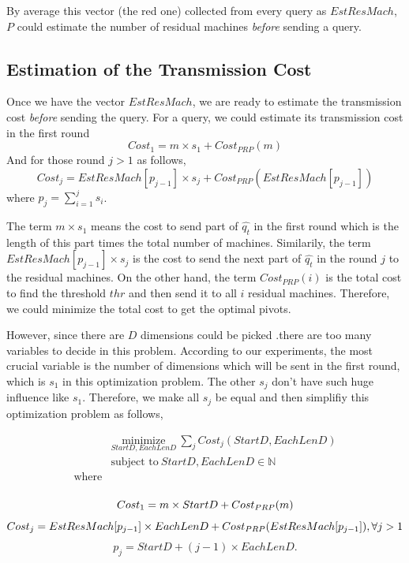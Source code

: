 By average this vector (the red one) collected from every query as $EstResMach$, $P$ could estimate the number of residual machines \emph{before} sending a query.



\subsection{Estimation of the Transmission Cost} %
\label{ss:estimate_the_transmission_cost}

Once we have the vector $EstResMach$, we are ready to estimate the transmission cost \emph{before} sending the query.  For a query, we could estimate its transmission cost in the first round 
\[
Cost_1 = m\times s_1 + Cost_{PRP}(m)
\]
And for those round $j>1$ as follows,
\[
Cost_j = EstResMach[p_{j-1}]\times s_j + Cost_{PRP}(EstResMach[p_{j-1}])
\]
where $p_j=\sum^j_{i=1}{s_i}$.

The term $m\times s_1$ means the cost to send part of $\hat{q_t}$ in the first round which is the length of this part times the total number of machines.  Similarily, the term $EstResMach[p_{j-1}]\times s_j$ is the cost to send the next part of $\hat{q_t}$ in the round $j$ to the residual machines.  On the other hand, the term $Cost_{PRP}(i)$ is the total cost to find the threshold $thr$ and then send it to all $i$ residual machines. Therefore, we could minimize the total cost to get the optimal pivots.

However, since there are $D$ dimensions could be picked .there are too many variables to decide in this problem.  According to our experiments, the most crucial variable is the number of dimensions which will be sent in the first round, which is $s_1$ in this optimization problem.  The other $s_j$ don't have such huge influence like $s_1$.  Therefore, we make all $s_j$ be equal and then simplifiy this optimization problem as follows,

\begin{equation}
\begin{aligned}
& \underset{StartD, EachLenD}{\text{minimize}}
~\sum_j{Cost_j(StartD,EachLenD)} \\
& \text{subject to}
~StartD, EachLenD \in \mathbb{N}\\
\text{where} \\ 
\end{aligned}
\end{equation}

\[
Cost_1 = m\times StartD + Cost_{PRP}(m) \\
\]
\[
Cost_j = EstResMach[p_{j-1}]\times EachLenD + Cost_{PRP}(EstResMach[p_{j-1}]), \forall j>1\\
\]
\[
p_j=StartD + (j-1)\times EachLenD.
\]

